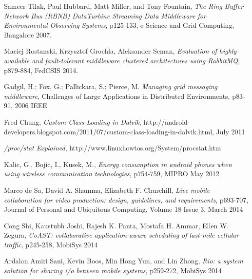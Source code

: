 \documentclass[conference]{IEEEtran}
\begin{document}


%
%
%
\begin{thebibliography}{100}

Sameer Tilak, Paul Hubbard, Matt Miller, and Tony Fountain, \emph{The Ring Buffer Network Bus (RBNB) DataTurbine Streaming Data Middleware for Environmental Observing Systems}, p125-133, e-Science and Grid Computing, Bangalore 2007.

Maciej Rostanski, Krzysztof Grochla, Aleksander Seman, \emph{Evaluation of highly available and fault-tolerant
middleware clustered architectures using RabbitMQ}, p879-884, FedCSIS 2014.

Gadgil, H.; Fox, G.; Pallickara, S.; Pierce, M. \emph{Managing grid messaging middleware}, Challenges of Large Applications in Distributed Environments, p83-91, 2006 IEEE

Fred Chung, \emph{Custom Class Loading in Dalvik}, http://android-developers.blogspot.com/2011/07/custom-class-loading-in-dalvik.html, July 2011

\emph{/proc/stat Explained}, http://www.linuxhowtos.org/System/procstat.htm

Kalic, G., Bojic, I., Kusek, M., \emph{Energy consumption in android phones when using wireless communication technologies}, p754-759, MIPRO May 2012

Marco de Sa, David A. Shamma, Elizabeth F. Churchill, \emph{Live mobile collaboration for video production: design, guidelines, and requirements}, p693-707, Journal of Personal and Ubiquitous Computing, Volume 18 Issue 3, March 2014

Cong Shi, Kaustubh Joshi, Rajesh K. Panta, Mostafa H. Ammar, Ellen W. Zegura, \emph{CoAST: collaborative application-aware scheduling of last-mile cellular traffic}, p245-258, MobiSys 2014

Ardalan Amiri Sani, Kevin Boos, Min Hong Yun, and Lin Zhong, \emph{Rio: a system solution for sharing i/o between mobile systems}, p259-272, MobiSys 2014


\end{thebibliography}
\end{document}
